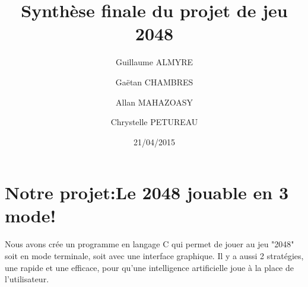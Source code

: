 \documentclass{report}
\begin{document}
\lstset{language=C}

\title{Synthèse finale du projet de jeu 2048}
\author{Guillaume ALMYRE 
\and
Ga\"{e}tan CHAMBRES
\and
Allan MAHAZOASY
\and 
Chrystelle PETUREAU}
\date{21/04/2015}

\maketitle

\tableofcontents

\chapter{Notre projet:Le 2048 jouable en 3 mode!}
Nous avons crée un programme en langage C qui permet de jouer au jeu "2048" soit en mode terminale, soit avec une interface graphique. Il y a aussi 2 stratégies, une rapide et une efficace, pour qu'une intelligence artificielle joue à la place de l'utilisateur.
\end{document}
